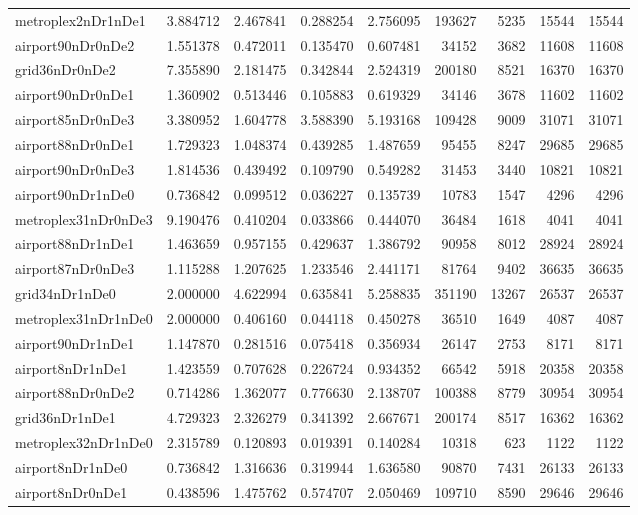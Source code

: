 \begin{longtable}{|l|r|r|r|r|r|r|r|r|}
metroplex2nDr1nDe1 & 3.884712 & 2.467841 & 0.288254 & 2.756095 & 193627 & 5235 & 15544 & 15544 \\
airport90nDr0nDe2 & 1.551378 & 0.472011 & 0.135470 & 0.607481 & 34152 & 3682 & 11608 & 11608 \\
grid36nDr0nDe2 & 7.355890 & 2.181475 & 0.342844 & 2.524319 & 200180 & 8521 & 16370 & 16370 \\
airport90nDr0nDe1 & 1.360902 & 0.513446 & 0.105883 & 0.619329 & 34146 & 3678 & 11602 & 11602 \\
airport85nDr0nDe3 & 3.380952 & 1.604778 & 3.588390 & 5.193168 & 109428 & 9009 & 31071 & 31071 \\
airport88nDr0nDe1 & 1.729323 & 1.048374 & 0.439285 & 1.487659 & 95455 & 8247 & 29685 & 29685 \\
airport90nDr0nDe3 & 1.814536 & 0.439492 & 0.109790 & 0.549282 & 31453 & 3440 & 10821 & 10821 \\
airport90nDr1nDe0 & 0.736842 & 0.099512 & 0.036227 & 0.135739 & 10783 & 1547 & 4296 & 4296 \\
metroplex31nDr0nDe3 & 9.190476 & 0.410204 & 0.033866 & 0.444070 & 36484 & 1618 & 4041 & 4041 \\
airport88nDr1nDe1 & 1.463659 & 0.957155 & 0.429637 & 1.386792 & 90958 & 8012 & 28924 & 28924 \\
airport87nDr0nDe3 & 1.115288 & 1.207625 & 1.233546 & 2.441171 & 81764 & 9402 & 36635 & 36635 \\
grid34nDr1nDe0 & 2.000000 & 4.622994 & 0.635841 & 5.258835 & 351190 & 13267 & 26537 & 26537 \\
metroplex31nDr1nDe0 & 2.000000 & 0.406160 & 0.044118 & 0.450278 & 36510 & 1649 & 4087 & 4087 \\
airport90nDr1nDe1 & 1.147870 & 0.281516 & 0.075418 & 0.356934 & 26147 & 2753 & 8171 & 8171 \\
airport8nDr1nDe1 & 1.423559 & 0.707628 & 0.226724 & 0.934352 & 66542 & 5918 & 20358 & 20358 \\
airport88nDr0nDe2 & 0.714286 & 1.362077 & 0.776630 & 2.138707 & 100388 & 8779 & 30954 & 30954 \\
grid36nDr1nDe1 & 4.729323 & 2.326279 & 0.341392 & 2.667671 & 200174 & 8517 & 16362 & 16362 \\
metroplex32nDr1nDe0 & 2.315789 & 0.120893 & 0.019391 & 0.140284 & 10318 & 623 & 1122 & 1122 \\
airport8nDr1nDe0 & 0.736842 & 1.316636 & 0.319944 & 1.636580 & 90870 & 7431 & 26133 & 26133 \\
airport8nDr0nDe1 & 0.438596 & 1.475762 & 0.574707 & 2.050469 & 109710 & 8590 & 29646 & 29646 \\

\end{longtable}
